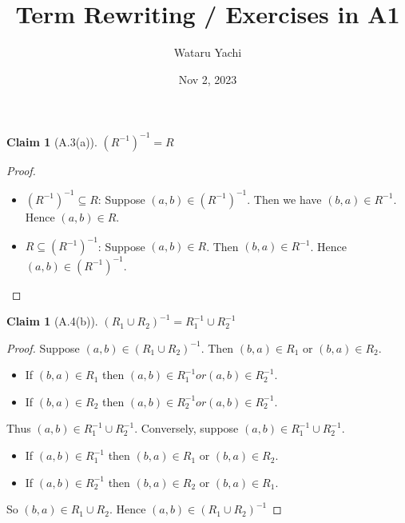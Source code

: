 \documentclass[12pt,aspectratio=169]{beamer}
\title{ Term Rewriting / Exercises in A1 }
\author{Wataru Yachi}
\institute{JAIST}
\date{Nov 2, 2023}
\theoremstyle{claim}
\newtheorem{claim}[theorem]{Claim}%
\begin{document}
\maketitle
\newcommand{\R}[3]{#1 \; #2 \; #3}

\begin{frame}
    \begin{claim}[A.3(a)]
      $(R^{-1})^{-1} = R$
    \end{claim}
    \begin{proof}
      \begin{itemize}
      \item $(R^{-1})^{-1} \subseteq R$:
      Suppose $(a,b) \in (R^{-1})^{-1}$.
      Then we have $(b,a) \in R^{-1}$.
      Hence $(a,b) \in R$.
  \item $R \subseteq (R^{-1})^{-1}$: Suppose $(a,b) \in R$.
      Then $(b,a) \in R^{-1}$. Hence $(a,b) \in (R^{-1})^{-1}$.
      \end{itemize}
    \end{proof}
\end{frame}

\begin{frame}
    \begin{claim}[A.4(b)]
        $(R_1 \cup R_2)^{-1} = R_1^{-1} \cup R_2^{-1}$
    \end{claim}
    \begin{proof}
        Suppose $(a,b) \in (R_1 \cup R_2)^{-1}$.
        Then $(b,a) \in R_1$ or $(b,a) \in R_2$.
        \begin{itemize}
          \item If $(b,a) \in R_1$ then $(a,b) \in R_1^{-1} or (a,b) \in R_2^{-1}$.
          \item If $(b,a) \in R_2$ then $(a,b) \in R_2^{-1} or (a,b) \in R_2^{-1}$.
        \end{itemize}
        Thus $(a,b) \in R_1^{-1} \cup R_2^{-1}$.
        Conversely, suppose $(a,b) \in R_1^{-1} \cup R_2^{-1}$.
        \begin{itemize}
          \item If $(a,b) \in R_1^{-1}$ then $(b,a) \in R_1$ or $(b,a) \in R_2$.
          \item If $(a,b) \in R_2^{-1}$ then $(b,a) \in R_2$ or $(b,a) \in R_1$.
        \end{itemize}
        So $(b,a) \in R_1 \cup R_2$. Hence $(a,b) \in (R_1 \cup R_2)^{-1}$
    \end{proof}
\end{frame}
\end{document}
